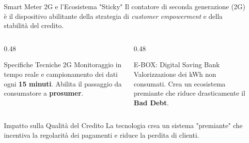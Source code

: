 \begin{frame}{Smart Meter 2G e l'Ecosistema "Sticky"}
    Il contatore di seconda generazione (2G) è il dispositivo abilitante della strategia di \textit{customer empowerment} e della stabilità del credito.
    \vspace{0.2cm}

    \begin{columns}[T]
        \begin{column}{0.48\textwidth}
            \begin{block}{Specifiche Tecniche 2G}
                Monitoraggio in tempo reale e campionamento dei dati ogni \textbf{15 minuti}. Abilita il passaggio da consumatore a \textbf{prosumer}.
            \end{block}
        \end{column}
        \pause
        
        \begin{column}{0.48\textwidth}
            \begin{block}{E-BOX: Digital Saving Bank}
                Valorizzazione dei kWh non consumati. Crea un ecosistema premiante che riduce drasticamente il \textbf{Bad Debt}.
            \end{block}
        \end{column}
    \end{columns}
    \vspace{0.3cm}
    \pause
    
    \begin{alertblock}{Impatto sulla Qualità del Credito}
        La tecnologia crea un sistema "premiante" che incentiva la regolarità dei pagamenti e riduce la perdita di clienti.
    \end{alertblock}
\end{frame}
